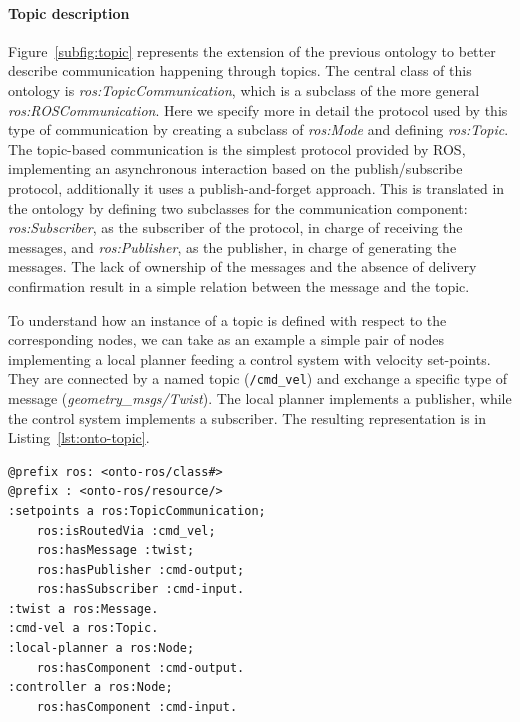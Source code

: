 \paragraph{Topic description} Figure~\ref{subfig:topic} represents the extension of the previous ontology to better describe communication happening through topics. The central class of this ontology is \textit{ros:Topic\-Com\-mu\-ni\-ca\-tion}, which is a subclass of the more general \textit{ros:ROS\-Com\-mu\-ni\-ca\-tion}. Here we specify more in detail the protocol used by this type of communication by creating a subclass of \textit{ros:Mode} and defining \textit{ros:Topic}. The topic-based communication is the simplest protocol provided by ROS, implementing an asynchronous interaction based on the publish/subscribe protocol, additionally it uses a publish-and-forget approach. This is translated in the ontology by defining two subclasses for the communication component: \textit{ros:Subscriber}, as the subscriber of the protocol, in charge of receiving the messages, and \textit{ros:Publisher}, as the publisher, in charge of generating the messages. The lack of ownership of the messages and the absence of delivery confirmation result in a simple relation between the message and the topic.

To understand how an instance of a topic is defined with respect to the corresponding nodes, we  can take as an example a simple pair of nodes implementing a local planner feeding a control system with velocity set-points. They are connected by a named topic (\texttt{/cmd\_vel}) and exchange a specific type of message (\textit{geometry\_msgs/Twist}). The local planner implements a publisher, while the control system implements a subscriber. The resulting representation is in Listing~\ref{lst:onto-topic}.

\begin{lstlisting}[frame=tb,caption={TODO},label=lst:onto-topic]
@prefix ros: <onto-ros/class#>
@prefix : <onto-ros/resource/>
:setpoints a ros:TopicCommunication;
	ros:isRoutedVia :cmd_vel;
	ros:hasMessage :twist;
	ros:hasPublisher :cmd-output;
	ros:hasSubscriber :cmd-input.
:twist a ros:Message.
:cmd-vel a ros:Topic.  
:local-planner a ros:Node;
	ros:hasComponent :cmd-output.
:controller a ros:Node;
	ros:hasComponent :cmd-input.
 \end{lstlisting}


